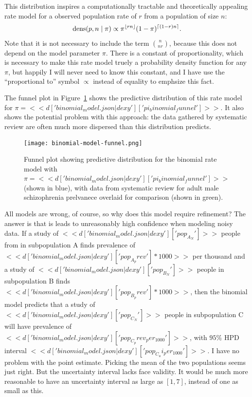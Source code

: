 This distribution inspires a computationally tractable and
theoretically appealing rate model for a observed population rate of
$r$ from a population of size $n$:
\[
\operatorname{dens}(p,n\;|\; \pi) \propto \pi^{\lfloor rn \rfloor}(1-\pi)^{\lceil (1-r)n \rceil}.
\]
Note that it is not necessary to include the term $\binom{n}{nr}$,
because this does not depend on the model parameter $\pi$. There is a
constant of proportionality, which is necessary to make this rate
model truely a probability density function for any $\pi$, but happily
I will never need to know this constant, and I have use the ``proportional to''
symbol $\propto$ instead of equality to emphsize this fact.

The funnel plot in Figure~\ref{fig:theory-rate_model-binom_funnel}
shows the predictive distribution of this rate model for $\pi=<<
d['binomial_model.json|dexy']['pi_binomial_funnel'] >>$.  It also shows
the potential problem with this approach: the data gathered by
systematic review are often much more dispersed than this
distribution predicts.

\begin{figure}[ht]
\begin{center}
\texttt{[image: binomial-model-funnel.png]}
\end{center}
\caption{Funnel plot showing predictive distribution for the binomial
  rate model with
  $\pi=<<d['binomial_model.json|dexy']['pi_binomial_funnel']>>$ (shown in
  blue), with data from systematic review for adult male schizophrenia
  prelvanece overlaid for comparison (shown in green).}
\label{fig:theory-rate_model-binom_funnel}
\end{figure}

All models are wrong, of course, so why does this model require
refinement? The answer is that is leads to unreasonably high
confidence when modeling noisy data.  If a study of
$<<d['binomial_model.json|dexy']['pop_A_N']>>$ people from in
subpopulation A finds prevalence of
$<<d['binomial_model.json|dexy']['pop_A_prev']*1000>>$ per thousand and
a study of $<<d['binomial_model.json|dexy']['pop_B_N']>>$ people in
subpopulation B finds $<<
d['binomial_model.json|dexy']['pop_B_prev']*1000 >>$, then the
binomial model predicts that a study of
$<<d['binomial_model.json|dexy']['pop_C_N']>>$ people in subpopulation
C will have prevalence of
$<<d['binomial_model.json|dexy']['pop_C_prev_per_1000']>>$, with
$95\%$ HPD interval
$<<d['binomial_model.json|dexy']['pop_C_ui_per_1000']>>$.  I have
no problem with the point estimate.  Picking the mean of the two
populations seems just right.  But the uncertainty interval lacks face
validity.  It would be much more reasonable to have an uncertainty
interval as large as $[1,7]$, instead of one as small as this.

